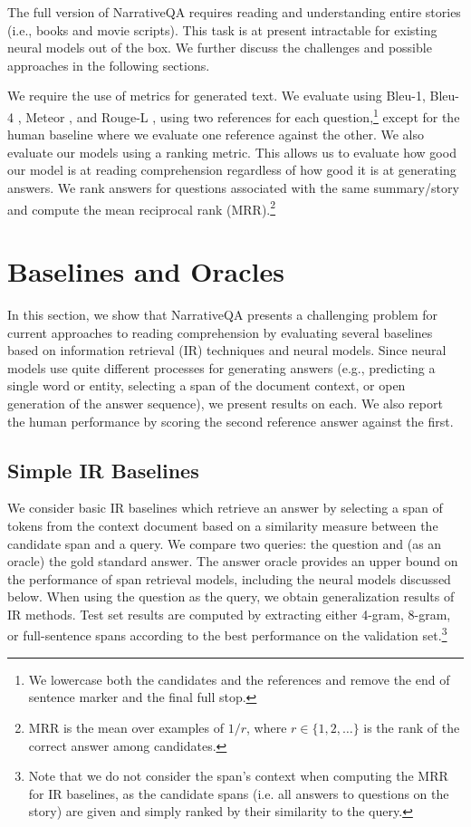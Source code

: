 \documentclass[11pt,letterpaper]{article}
\begin{document}
The full version of NarrativeQA requires reading and understanding entire stories (i.e., books and movie scripts).
This task is at present intractable for existing neural models out of the box. We further discuss the challenges and possible approaches in the following sections.



We require the use of metrics for generated text.
We evaluate using \mbox{Bleu-1}, \mbox{Bleu-4} \cite{papineni2002bleu}, Meteor \cite{denkowski:lavie:meteor-wmt:2011}, and \mbox{Rouge-L} \cite{Rouge}, using two references for each question,\footnote{We lowercase both the candidates and the references and remove the end of sentence marker and the final full stop.} except for the human baseline where we evaluate one reference against the other.
We also evaluate our models using a ranking metric. This allows us to evaluate how good our model is at reading comprehension regardless of how good it is at generating answers. We rank answers for questions associated with the same summary/story and compute the mean reciprocal rank (MRR).\footnote{MRR is the mean over examples of $1/r$, where $r\in\{1,2, \ldots \}$ is the rank of the correct answer among candidates.}




\section{Baselines and Oracles}
\label{sec:baselinebenchmarks}

In this section, we show that NarrativeQA presents a challenging problem for current approaches to reading comprehension by evaluating several baselines based on information retrieval (IR) techniques and neural models. Since neural models use quite different processes for generating answers (e.g., predicting a single word or entity, selecting a span of the document context, or open generation of the answer sequence), we present results on each. We also report the human performance by scoring the second reference answer against the first.



\subsection{Simple IR Baselines}
\label{sec:ir_baselines}

We consider basic IR baselines which retrieve an answer by selecting a span of tokens from the context document based on a similarity measure between the candidate span and a query. We compare two queries: the question and (as an oracle) the gold standard answer. The answer oracle provides an upper bound on the performance of span retrieval models, including the neural models discussed below.
When using the question as the query, we obtain generalization results of IR methods. Test set results are computed by extracting either 4-gram, 8-gram, or full-sentence spans according to the best performance on the validation set.\footnote{Note that we do not consider the span's context when computing the MRR for IR baselines, as the candidate spans (i.e. all answers to questions on the story) are given and simply ranked by their similarity to the query.}
\end{document}
